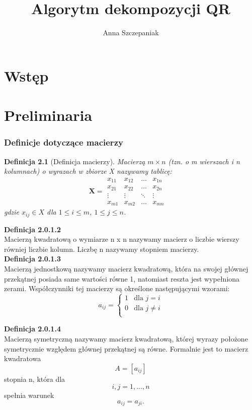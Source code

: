 \documentclass[10pt,a4paper]{report}
\author{Anna Szczepaniak}
\title{Algorytm dekompozycji QR}
\newtheorem{definition}[chapter]{Definicja}
\begin{document}
\maketitle


\chapter{Wstęp}


\chapter{Preliminaria}

\subsection{Definicje dotyczące macierzy} 

\begin{definition}[Definicja macierzy]
Macierzą $m \times n$ (tzn. o m wierszach i n kolumnach) o wyrazach w zbiorze X nazywamy tablicę:
$$
\mathbf{X} =
\begin{matrix}
x_{11} & x_{12} & \ldots & x_{1n}&   \\
x_{21} & x_{22} & \ldots & x_{2n}& \\
\vdots & \vdots & \ddots & \vdots \\
x_{m1} & x_{m2} & \ldots & x_{mn}&
\end{matrix}
$$
gdzie $x_{ij} \in X$  dla $1\le i\le m$, $1\le j\le n$.
\end{definition}


\noindent \textbf{Definicja 2.0.1.2}\\
\noindent Macierzą kwadratową o wymiarze n x n nazywamy macierz o liczbie wierszy równiej liczbie kolumn. Liczbę n nazywamy stopniem macierzy.\\

\noindent \textbf{Definicja 2.0.1.3}\\
\noindent Macierzą jednostkową nazywamy macierz kwadratową, która na swojej głównej przekątnej posiada same wartości równe 1, natomiast reszta jest wypełniona zerami. Współczynniki tej macierzy są określone następującymi wzorami: $$
a_{ij} = \left\{ \begin{array}{ll}
1 & \textrm{dla $j=i$}\\
0 & \textrm{dla $j\ne i$}\\
\end{array} \right.
$$

\noindent \textbf{Definicja 2.0.1.4}\\
\noindent Macierzą symetryczną nazywamy macierz kwadratową, której wyrazy położone symetrycznie względem głównej przekątnej są równe. Formalnie jest to macierz kwadratowa $$A=[a_{ij}]$$ stopnia n, która dla $$i,j=1,...,n$$ spełnia warunek 
$$
a_{ij}=a_{ji}.
$$
\end{document}
